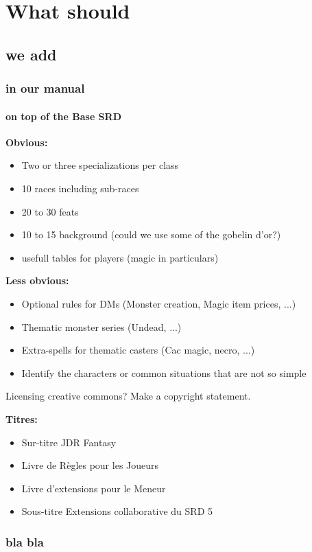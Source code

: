 \documentclass{dd}
\begin{document}
\chapter{What should}
\section{we add}
\subsection{in our manual}
\subsubsection{on top of the Base SRD}
\bfseries{Obvious:}
\begin{itemize}
  \item Two or three specializations per class
  \item 10 races including sub-races
  \item 20 to 30 feats
  \item 10 to 15 background (could we use some of the gobelin d'or?)
  \item usefull tables for players (magic in particulars)
\end{itemize}

\bfseries{Less obvious:}
\begin{itemize}
  \item Optional rules for DMs (Monster creation, Magic item prices, ...)
  \item Thematic monster series (Undead, ...)
  \item Extra-spells for thematic casters (Cac magic, necro, ...)
  \item Identify the characters or common situations that are not so simple
\end{itemize}

Licensing creative commons?
Make a copyright statement.

\bfseries{Titres:}
\begin{itemize}
  \item Sur-titre JDR Fantasy
  \item Livre de Règles pour les Joueurs
  \item Livre d'extensions pour le Meneur 
  \item Sous-titre Extensions collaborative du SRD 5
\end{itemize}


\subsection{bla bla}
\end{document}
